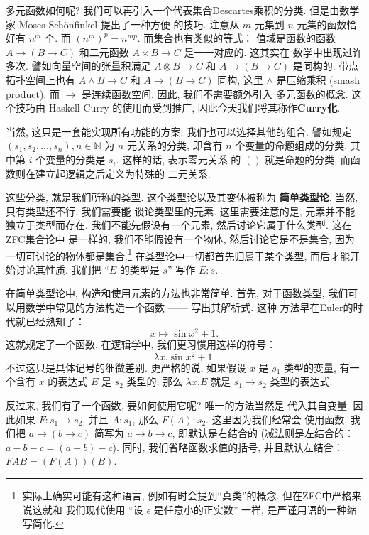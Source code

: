多元函数如何呢? 我们可以再引入一个代表集合Descartes乘积的分类.
但是由数学家 Moses Sch\"onfinkel 提出了一种方便
的技巧. 注意从 \(m\) 元集到 \(n\)
元集的函数恰好有 \(n^m\) 个. 而 \((n^m)^p = n^{mp}\).
而集合也有类似的等式： 值域是函数的函数 \(A \to (B \to C)\)
和二元函数 \(A \times B \to C\) 是一一对应的. 这其实在
数学中出现过许多次. 譬如向量空间的张量积满足
\(A \otimes B \to C\) 和 \(A \to (B \to C)\) 是同构的.
带点拓扑空间上也有 \(A \wedge B \to C\) 和 \(A \to (B \to C)\)
同构, 这里 \(\wedge\) 是压缩乘积 (smash product), 而
\(\to\) 是连续函数空间. 因此, 我们不需要额外引入
多元函数的概念. 这个技巧由 Haskell Curry 的使用而受到推广,
因此今天我们将其称作\textbf{Curry化}.

当然, 这只是一套能实现所有功能的方案. 我们也可以选择其他的组合.
譬如规定 \((s_1, s_2, \dots, s_n), n\in\mathbb N\) 为
\(n\) 元关系的分类, 即含有 \(n\) 个变量的命题组成的分类.
其中第 \(i\) 个变量的分类是 \(s_i\). 这样的话, 表示零元关系
的 \(()\) 就是命题的分类, 而函数则在建立起逻辑之后定义为特殊的
二元关系.

这些分类, 就是我们所称的类型. 这个类型论以及其变体被称为%
\textbf{简单类型论}. 当然, 只有类型还不行, 我们需要能
谈论类型里的元素. 这里需要注意的是, 元素并不能独立于类型而存在.
我们不能先假设有一个元素, 然后讨论它属于什么类型. 这在ZFC集合论中
是一样的, 我们不能假设有一个物体, 然后讨论它是不是集合, 因为
一切可讨论的物体都是集合.\footnote{实际上确实可能有这种语言,
例如有时会提到“真类”的概念. 但在ZFC中严格来说这就和
我们现代使用 “设 \(\epsilon\) 是任意小的正实数” 一样,
是严谨用语的一种缩写简化.} 在类型论中一切都首先归属于某个类型,
而后才能开始讨论其性质. 我们把 “\(E\) 的类型是 \(s\)” 写作
\(E : s\).

在简单类型论中, 构造和使用元素的方法也非常简单. 首先, 对于函数类型,
我们可以用数学中常见的方法构造一个函数 ------ 写出其解析式. 这种
方法早在Euler的时代就已经熟知了：
\[x \mapsto \sin x^2 + 1.\]
这就规定了一个函数. 在逻辑学中, 我们更习惯用这样的符号：
\[\lambda x. \sin x^2 + 1.\]
不过这只是具体记号的细微差别. 更严格的说, 如果假设 \(x\) 是
\(s_1\) 类型的变量, 有一个含有 \(x\) 的表达式 \(E\) 是
\(s_2\) 类型的; 那么 \(\lambda x. E\) 就是 \(s_1 \to s_2\)
类型的表达式.

反过来, 我们有了一个函数, 要如何使用它呢? 唯一的方法当然是
代入其自变量. 因此如果 \(F : s_1 \to s_2\), 并且
\(A : s_1\), 那么 \(F(A) : s_2\). 这里因为我们经常会
使用函数, 我们把 \(a \to (b \to c)\) 简写为 \(a \to b \to c\),
即默认是右结合的 (减法则是左结合的： \(a - b - c = (a - b) - c\)).
同时, 我们省略函数求值的括号, 并且默认左结合： \(FAB = (F(A))(B)\).

